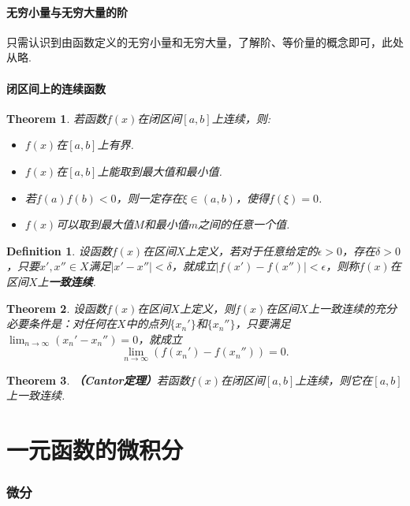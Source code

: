 \documentclass[9pt]{ctexart}
\newtheorem{definition}{Definition}[section]
\newtheorem{theorem}{Theorem}[section]
\begin{document}
\subsection{无穷小量与无穷大量的阶}
\par{只需认识到由函数定义的无穷小量和无穷大量，了解阶、等价量的概念即可，此处从略.}
\subsection{闭区间上的连续函数}
\begin{theorem}
    若函数$f(x)$在闭区间$[a,b]$上连续，则:
    \begin{itemize}
        \item[（1）] $f(x)$在$[a,b]$上有界.
        \item[（2）] $f(x)$在$[a,b]$上能取到最大值和最小值.
        \item[（3）] 若$f(a)f(b)<0$，则一定存在$\xi\in(a,b)$，使得$f(\xi)=0$.
        \item[（4）] $f(x)$可以取到最大值$M$和最小值$m$之间的任意一个值.
    \end{itemize}
\end{theorem}

\begin{definition}
    设函数$f(x)$在区间$X$上定义，若对于任意给定的$\epsilon>0$，存在$\delta>0$，只要$x',x''\in X$满足$|x'-x''|<\delta$，就成立$|f(x')-f(x'')|<\epsilon$，则称$f(x)$在区间$X$上\textbf{一致连续}.
\end{definition}
\begin{theorem}
    设函数$f(x)$在区间$X$上定义，则$f(x)$在区间$X$上一致连续的充分必要条件是：对任何在$X$中的点列$\{x_n'\}$和$\{x_n''\}$，只要满足$\lim_{n\to\infty}(x_n'-x_n'')=0$，就成立
    \[\lim_{n\to\infty}(f(x_n')-f(x_n''))=0.\]
\end{theorem}
\begin{theorem}
    \textbf{（Cantor定理）}若函数$f(x)$在闭区间$[a,b]$上连续，则它在$[a,b]$上一致连续.
\end{theorem}

\newpage
\part{一元函数的微积分}
\section{微分}
\end{document}
